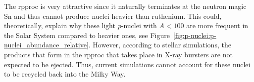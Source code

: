 The \ac{rpproc} is very attractive since it naturally terminates at the neutron magic Sn and thus cannot produce nuclei heavier than ruthenium. This could, theoretically, explain why these light \textit{p}-nuclei with $A<100$ are more frequent in the Solar System compared to heavier ones, see Figure~\ref{fig:p-nuclei:p-nuclei_abundance_relative}. However, according to stellar simulations, the products that form in the \ac{rpproc} that takes place in X-ray bursters are not expected to be ejected. Thus, current simulations cannot account for these nuclei to be recycled back into the Milky Way.







